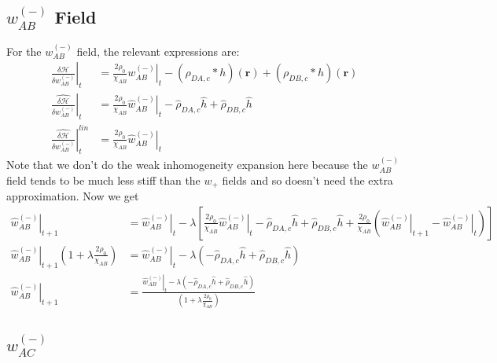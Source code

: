 \documentclass{article}
\begin{document}
\subsection{$w_{AB}^{(-)}$ Field}

For the $w_{AB}^{(-)}$ field, the relevant expressions are:
\begin{align*}
  \left. \frac{\delta \mathcal{H}}{\delta w_{AB}^{(-)}} \right|_t &=
    \frac{2 \rho_0}{\chi_{AB}} \left. w_{AB}^{(-)} \right|_t
    - (\rho_{DA,c} \ast h)(\mathbf{r})
    + (\rho_{DB,c} \ast h)(\mathbf{r}) \\
  \left. \hat{\frac{\delta \mathcal{H}}{\delta w_{AB}^{(-)}}} \right|_t &=
    \frac{2 \rho_0}{\chi_{AB}} \left. \hat{w}_{AB}^{(-)} \right|_t
    - \hat{\rho}_{DA,c} \hat{h}
    + \hat{\rho}_{DB,c} \hat{h} \\
  \left.
    \hat{\frac{\delta \mathcal{H}}{\delta w_{AB}^{(-)}}}
  \right| ^{lin}_t &=
    \frac{2\rho_0}{\chi_{AB}} \left. \hat{w}_{AB}^{(-)} \right|_t
\end{align*}
Note that we don't do the weak inhomogeneity expansion here because the
  $w_{AB}^{(-)}$ field tends to be much less stiff than the $w_+$ fields and so
  doesn't need the extra approximation.
Now we get
\begin{align*}
  \left. \hat{w}_{AB}^{(-)} \right|_{t+1} &=
    \left. \hat{w}_{AB}^{(-)} \right|_t - \lambda \left[
      \frac{2\rho_0}{\chi_{AB}} \left. \hat{w}_{AB}^{(-)} \right|_t
      - \hat{\rho}_{DA,c} \hat{h}
      + \hat{\rho}_{DB,c} \hat{h}
      + \frac{2\rho_0}{\chi_{AB}}
        ( \left. \hat{w}_{AB}^{(-)}\right|_{t+1}
          - \left. \hat{w}_{AB}^{(-)} \right|_t
        )
    \right] \\
  \left. \hat{w}_{AB}^{(-)} \right|_{t+1} ( 1 + \lambda \frac{2
    \rho_0}{\chi_{AB}} ) &=
    \left. \hat{w}_{AB}^{(-)} \right|_t - \lambda \left(
      - \hat{\rho}_{DA,c} \hat{h}
      + \hat{\rho}_{DB,c} \hat{h}
    \right) \\
  \left. \hat{w}_{AB}^{(-)} \right|_{t+1} &=
    \frac{
      \left. \hat{w}_{AB}^{(-)} \right|_t - \lambda \left(
        - \hat{\rho}_{DA,c} \hat{h}
        + \hat{\rho}_{DB,c} \hat{h}
      \right)
    }
    {
      \left( 1 + \lambda \frac{2 \rho_0}{\chi_{AB}} \right)
    }
\end{align*}

\subsection{$w_{AC}^{(-)}$}
\end{document}
